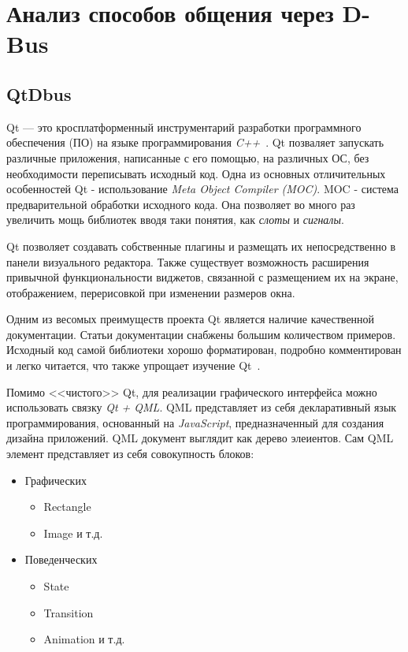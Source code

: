 \section{Анализ способов общения через D-Bus}
\subsection{QtDbus}
Qt --- это кросплатформенный инструментарий разработки программного обеспечения (ПО) на языке программирования \textit{C++}~\cite{Qt}. Qt позваляет запускать различные приложения, написанные с его помощью, на различных ОС, без необходимости переписывать исходный код. Одна из основных отличительных особенностей Qt - использование \textit{Meta Object Compiler (MOC)}. MOC - система предварительной обработки исходного кода. Она позволяет во много раз увеличить мощь библиотек вводя таки понятия, как \textit{слоты} и \textit{сигналы}. 

Qt позволяет создавать собственные плагины и размещать их непосредственно в панели визуального редактора. Также существует возможность расширения привычной функциональности виджетов, связанной с размещением их на экране, отображением, перерисовкой при изменении размеров окна.

Одним из весомых преимуществ проекта Qt является наличие качественной документации. Статьи документации снабжены большим количеством примеров. Исходный код самой библиотеки хорошо форматирован, подробно комментирован и легко читается, что также упрощает изучение Qt~\cite{QtDoc}.

Помимо <<чистого>> Qt, для реализации графического интерфейса можно использовать связку \textit{Qt + QML}. QML представляет из себя декларативный язык программирования, основанный на \textit{JavaScript}, предназначенный для создания дизайна приложений. QML документ выглядит как дерево элеиентов. Сам QML элемент представляет из себя совокупность блоков:
\begin{itemize}
\item Графических
	\begin{itemize}
	\item Rectangle
	\item Image и т.д.
	\end{itemize}
\item Поведенческих
	\begin{itemize}
	\item State
	\item Transition
	\item Animation и т.д.
	\end{itemize}
\end{itemize}

